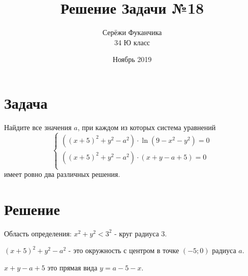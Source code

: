 \documentclass{article}
\title{Решение Задачи №18}
\author{Серёжи Фуканчика\\34 Ю класс}
\date{Ноябрь 2019}
\begin{document}
\maketitle

\section{Задача}
Найдите все значения $a$, при каждом из которых система уравнений
$$
\begin{cases}
  \left((x+5)^2+y^2-a^2\right)\cdot{}\ln{\left(9-x^2-y^2\right)}=0 \\
  \left((x+5)^2+y^2-a^2\right)\cdot{}\left(x+y-a+5\right)=0 \\
\end{cases}
$$
имеет ровно два различных решения.
\section{Решение}
Область определения: $x^2+y^2<3^2$ - круг радиуса 3.

$(x+5)^2+y^2-a^2$ - это окружность с центром в точке $(-5;0)$ радиуса $a$.

$x+y-a+5$ это прямая вида $y=a-5-x$.

\end{document}

